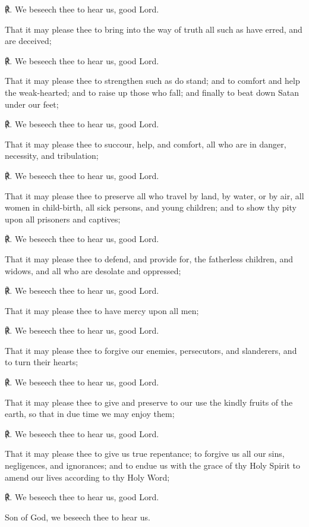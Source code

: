    ℟. We beseech thee to hear us, good Lord.
    \par\noindent
    That it may please thee to bring into the way of truth all such as have erred, and are deceived;
    
    ℟. We beseech thee to hear us, good Lord.
    \par\noindent
    That it may please thee to strengthen such as do stand; and to comfort and help the weak-hearted; and to raise up those who fall; and finally to beat down Satan under our feet;
    
    ℟. We beseech thee to hear us, good Lord.
    \par\noindent
    That it may please thee to succour, help, and comfort, all who are in danger, necessity, and tribulation;
    
    ℟. We beseech thee to hear us, good Lord.
    \par\noindent
    That it may please thee to preserve all who travel by land, by water, or by air, all women in child-birth, all sick persons, and young children; and to show thy pity upon all prisoners and captives;

    ℟. We beseech thee to hear us, good Lord.
    \par\noindent
    That it may please thee to defend, and provide for, the fatherless children, and widows, and all who are desolate and oppressed;
    
    ℟. We beseech thee to hear us, good Lord.
    \par\noindent
    That it may please thee to have mercy upon all men;
    
    ℟. We beseech thee to hear us, good Lord.
    \par\noindent
    That it may please thee to forgive our enemies, persecutors, and slanderers, and to turn their hearts;
    
    ℟. We beseech thee to hear us, good Lord.
    \par\noindent
    That it may please thee to give and preserve to our use the kindly fruits of the earth, so that in due time we may enjoy them;
    
    ℟. We beseech thee to hear us, good Lord.
    \par\noindent
    That it may please thee to give us true repentance; to forgive us all our sins, negligences, and ignorances; and to endue us with the grace of thy Holy Spirit to amend our lives according to thy Holy Word;
    
    ℟. We beseech thee to hear us, good Lord.
    \par\noindent
    Son of God, we beseech thee to hear us.
    

